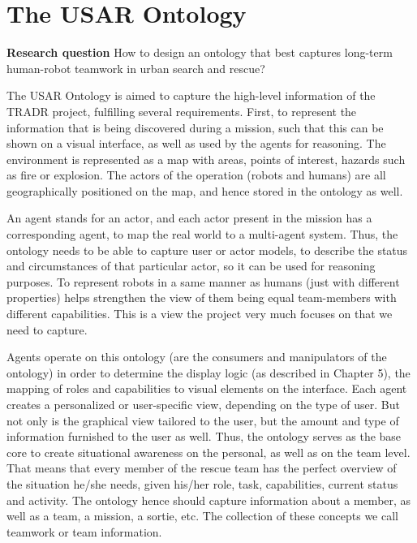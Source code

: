 \chapter{The USAR Ontology}
\textbf{Research question} How to design an ontology that best captures long-term human-robot teamwork in urban search and rescue? 

The USAR Ontology is aimed to capture the high-level information of the TRADR project, fulfilling several requirements. First, to represent the information that is being discovered during a mission, such that this can be shown on a visual interface, as well as used by the agents for reasoning. 
The environment is represented as a map with areas, points of interest, hazards such as fire or explosion. The actors of the operation (robots and humans) are all geographically positioned on the map, and hence stored in the ontology as well. 

An agent stands for an actor, and each actor present in the mission has a corresponding agent, to map the real world to a multi-agent system. Thus, the ontology needs to be able to capture user or actor models, to describe the status and circumstances of that particular actor, so it can be used for reasoning purposes.
To represent robots in a same manner as humans (just with different properties) helps strengthen the view of them being equal team-members with different capabilities. This is a view the project very much focuses on that we need to capture.

Agents operate on this ontology (are the consumers and manipulators of the ontology) in order to determine the display logic (as described in Chapter 5), the mapping of roles and capabilities to visual elements on the interface. Each agent creates a personalized or user-specific view, depending on the type of user. But not only is the graphical view tailored to the user, but the amount and type of information furnished to the user as well. Thus, the ontology serves as the base core to create situational awareness on the personal, as well as on the team level. That means that every member of the rescue team has the perfect overview of the situation he/she needs, given his/her role, task, capabilities, current status and activity. The ontology hence should capture information about a member, as well as a team, a mission, a sortie, etc. The collection of these concepts we call teamwork or team information.
 
